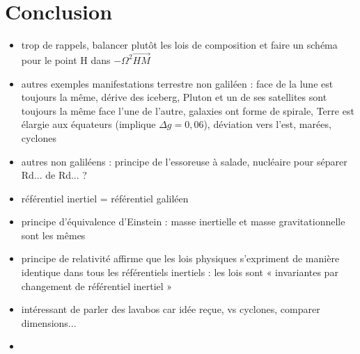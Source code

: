 \section*{Conclusion}



\begin{remarques} \begin{itemize} 
\item trop de rappels, balancer plutôt les lois de composition et faire un schéma pour le point H dans $-\Omega^2\vec{HM}$
\item autres exemples manifestations terrestre non galiléen : face de la lune est toujours la même, dérive des iceberg, Pluton et un de ses satellites sont toujours la même face l'une de l'autre, galaxies ont forme de spirale, Terre est élargie aux équateurs (implique $\Delta g=0,06$), déviation vers l'est, marées, cyclones
\item autres non galiléens : principe de l'essoreuse à salade, nucléaire pour séparer Rd... de Rd... ?
\item référentiel inertiel = référentiel galiléen
\item principe d'équivalence d'Einstein : masse inertielle et masse gravitationnelle sont les mêmes 
\item principe de relativité affirme que les lois physiques s'expriment de manière identique dans tous les référentiels inertiels : les lois sont « invariantes par changement de référentiel inertiel »
\item intéressant de parler des lavabos car idée reçue, vs cyclones, comparer dimensions... 
\item 
\end{itemize} \end{remarques}